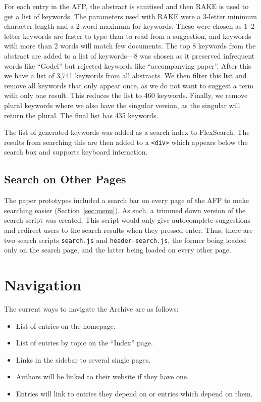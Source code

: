 \documentclass[bsc,frontabs,oneside,singlespacing,parskip,deptreport,logo]{infthesis}
\begin{document}
For each entry in the AFP, the abstract is sanitised and then RAKE is used to get a list of keywords. The parameters used with RAKE were a 3-letter minimum character length and a 2-word maximum for keywords. These were chosen as 1--2 letter keywords are faster to type than to read from a suggestion, and keywords with more than 2 words will match few documents. The top 8 keywords from the abstract are added to a list of keywords---8 was chosen as it preserved infrequent words like ``Godel'' but rejected keywords like ``accompanying paper''. After this we have a list of 3,741 keywords from all abstracts. We then filter this list and remove all keywords that only appear once, as we do not want to suggest a term with only one result. This reduces the list to 460 keywords. Finally, we remove plural keywords where we also have the singular version, as the singular will return the plural. The final list has 435 keywords.

The list of generated keywords was added as a search index to FlexSearch. The results from searching this are then added to a \verb|<div>| which appears below the search box and supports keyboard interaction.

\subsection{Search on Other Pages}

The paper prototypes included a search bar on every page of the AFP to make searching easier (Section~\ref{sec:menu}). As such, a trimmed down version of the search script was created. This script would only give autocomplete suggestions and redirect users to the search results when they pressed enter. Thus, there are two search scripts \verb|search.js| and \verb|header-search.js|, the former being loaded only on the search page, and the latter being loaded on every other page.

\section{Navigation}

The current ways to navigate the Archive are as follows:

\begin{itemize}
    \item List of entries on the homepage.
    \item List of entries by topic on the ``Index'' page.
    \item Links in the sidebar to several single pages.
    \item Authors will be linked to their website if they have one.
    \item Entries will link to entries they depend on or entries which depend on them.
\end{itemize}
\end{document}
